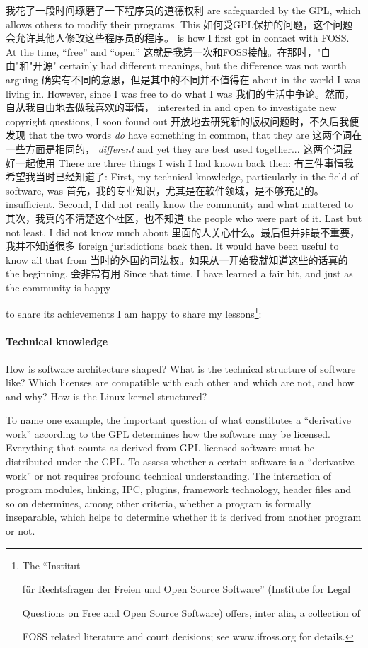 我花了一段时间琢磨了一下程序员的道德权利
are safeguarded by the GPL, which allows others to modify their programs. This
如何受GPL保护的问题，这个问题会允许其他人修改这些程序员的程序。
is how I first got in contact with FOSS. At the time, ``free'' and ``open''
这就是我第一次和FOSS接触。在那时，"自由"和"开源"
certainly had different meanings, but the difference was not worth arguing
确实有不同的意思，但是其中的不同并不值得在
about in the world I was living in. However, since I was free to do what I was
我们的生活中争论。然而，自从我自由地去做我喜欢的事情，
interested in and open to investigate new copyright questions, I soon found out
开放地去研究新的版权问题时，不久后我便发现
that the two words \textit{do} have something in common, that they are
这两个词在一些方面是相同的，
\textit{different} and yet they are best used together...
这两个词最好一起使用
There are three things I wish I had known back then:
有三件事情我希望我当时已经知道了:
First, my technical knowledge, particularly in the field of software, was
首先，我的专业知识，尤其是在软件领域，是不够充足的。
insufficient. Second, I did not really know the community and what mattered to
其次，我真的不清楚这个社区，也不知道
the people who were part of it. Last but not least, I did not know much about
里面的人关心什么。最后但并非最不重要，我并不知道很多
foreign jurisdictions back then. It would have been useful to know all that from
当时的外国的司法权。如果从一开始我就知道这些的话真的
the beginning.
会非常有用
Since that time, I have learned a fair bit, and just as the community is happy

to share its achievements I am happy to share my lessons\footnote{The ``Institut

f\"ur Rechtsfragen der Freien und Open Source Software'' (Institute for Legal

Questions on Free and Open Source Software) offers, inter alia, a collection of

FOSS related literature and court decisions; see www.ifross.org for details.}:

\paragraph*{Technical knowledge}
How is software architecture shaped? What is the technical structure of software
like? Which licenses are compatible with each other and which are not, and how
and why? How is the Linux kernel structured? 

To name one example, the important question of what constitutes a ``derivative
work'' according to the GPL determines how the software may be licensed.
Everything that counts as derived from GPL-licensed software must be distributed
under the GPL. To assess whether a certain software is a ``derivative work'' or
not requires profound technical understanding. The interaction of program
modules, linking, IPC, plugins, framework technology, header files and so on
determines, among other criteria, whether a program is formally inseparable,
which helps to determine whether it is derived from another program or not. 

